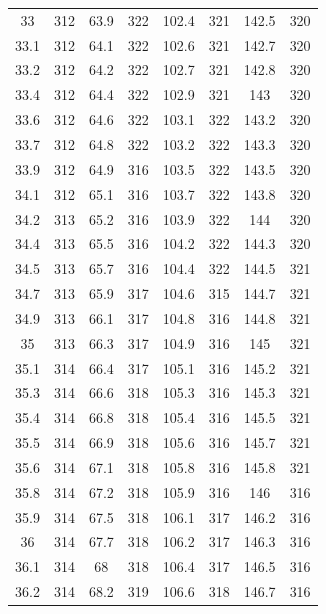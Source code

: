 \documentclass[12pt]{ctexart}
\numberwithin{equation}{section}
\begin{document}
\begin{longtable}{cc|cc|cc|cc}
33  &  312  &  63.9  &  322  &  102.4  &  321  &  142.5  &  320  \\
33.1  &  312  &  64.1  &  322  &  102.6  &  321  &  142.7  &  320  \\
33.2  &  312  &  64.2  &  322  &  102.7  &  321  &  142.8  &  320  \\
33.4  &  312  &  64.4  &  322  &  102.9  &  321  &  143  &  320  \\
33.6  &  312  &  64.6  &  322  &  103.1  &  322  &  143.2  &  320  \\
33.7  &  312  &  64.8  &  322  &  103.2  &  322  &  143.3  &  320  \\
33.9  &  312  &  64.9  &  316  &  103.5  &  322  &  143.5  &  320  \\
34.1  &  312  &  65.1  &  316  &  103.7  &  322  &  143.8  &  320  \\
34.2  &  313  &  65.2  &  316  &  103.9  &  322  &  144  &  320  \\
34.4  &  313  &  65.5  &  316  &  104.2  &  322  &  144.3  &  320  \\
34.5  &  313  &  65.7  &  316  &  104.4  &  322  &  144.5  &  321  \\
34.7  &  313  &  65.9  &  317  &  104.6  &  315  &  144.7  &  321  \\
34.9  &  313  &  66.1  &  317  &  104.8  &  316  &  144.8  &  321  \\
35  &  313  &  66.3  &  317  &  104.9  &  316  &  145  &  321  \\
35.1  &  314  &  66.4  &  317  &  105.1  &  316  &  145.2  &  321  \\
35.3  &  314  &  66.6  &  318  &  105.3  &  316  &  145.3  &  321  \\
35.4  &  314  &  66.8  &  318  &  105.4  &  316  &  145.5  &  321  \\
35.5  &  314  &  66.9  &  318  &  105.6  &  316  &  145.7  &  321  \\
35.6  &  314  &  67.1  &  318  &  105.8  &  316  &  145.8  &  321  \\
35.8  &  314  &  67.2  &  318  &  105.9  &  316  &  146  &  316  \\
35.9  &  314  &  67.5  &  318  &  106.1  &  317  &  146.2  &  316  \\
36  &  314  &  67.7  &  318  &  106.2  &  317  &  146.3  &  316  \\
36.1  &  314  &  68  &  318  &  106.4  &  317  &  146.5  &  316  \\
36.2  &  314  &  68.2  &  319  &  106.6  &  318  &  146.7  &  316  \\

\end{longtable}
\end{document}
